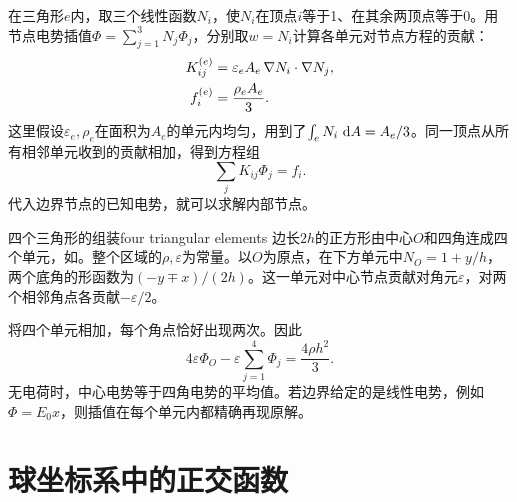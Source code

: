 在三角形$e$内，取三个线性函数$N_i$，使$N_i$在顶点$i$等于1、在其余两顶点等于0。用节点电势插值$\textstyle \Phi = \sum_{j=1}^3N_j\Phi_j$，分别取$w = N_i$计算各单元对节点方程的贡献：
\begin{subequations}
    \begin{align}
        K^{(e)}_{ij} &= \varepsilon_e A_e\,\nabla N_i \cdot \nabla N_j,\\
        f^{(e)}_i &= \frac{\rho_e A_e}{3}.
    \end{align}
\end{subequations}
这里假设$\varepsilon_e,\rho_e$在面积为$A_e$的单元内均匀，用到了$\textstyle \int_e N_i\,\mathop{}\!\mathrm{d} A = A_e/3$。同一顶点从所有相邻单元收到的贡献相加，得到方程组
\begin{equation}
    \label{eq:ed-electrostatic-fem-assembly}
    \sum_j K_{ij}\Phi_j = f_i.
\end{equation}
代入边界节点的已知电势，就可以求解内部节点。

\begin{example}{四个三角形的组装}{four triangular elements}
    边长$2h$的正方形由中心$O$和四角连成四个单元，如。整个区域的$\rho,\varepsilon$为常量。以$O$为原点，在下方单元中$N_O = 1 + y/h$，两个底角的形函数为$(-y \mp x)/(2h)$。这一单元对中心节点贡献对角元$\varepsilon$，对两个相邻角点各贡献$-\varepsilon/2$。
    \begin{notecaptionblock}
        \label{fig:triangular-elements}
    \end{notecaptionblock}
    将四个单元相加，每个角点恰好出现两次。因此
    \[
        4\varepsilon\Phi_O - \varepsilon\sum_{j=1}^4\Phi_j = \frac{4\rho h^2}{3}.
    \]
    无电荷时，中心电势等于四角电势的平均值。若边界给定的是线性电势，例如$\Phi = E_0 x$，则插值在每个单元内都精确再现原解。
\end{example}

\section{球坐标系中的正交函数}
\label{sec:laplace equation in spherical coordinate}

